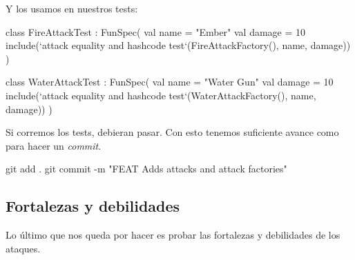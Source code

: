     Y los usamos en nuestros tests:

    \begin{kotlin}
      class FireAttackTest : FunSpec({
        val name = "Ember"
        val damage = 10
        include(`attack equality and hashcode test`(FireAttackFactory(), name, damage))
      })
    \end{kotlin}

    \begin{kotlin}
      class WaterAttackTest : FunSpec({
        val name = "Water Gun"
        val damage = 10
        include(`attack equality and hashcode test`(WaterAttackFactory(), name, damage))
      })
    \end{kotlin}

    Si corremos los tests, debieran pasar.
    Con esto tenemos suficiente avance como para hacer un \textit{commit}.

    \begin{powershell}
      git add .
      git commit -m "FEAT Adds attacks and attack factories"
    \end{powershell}

  \subsection{Fortalezas y debilidades}
    Lo último que nos queda por hacer es probar las fortalezas y debilidades de los ataques.
    